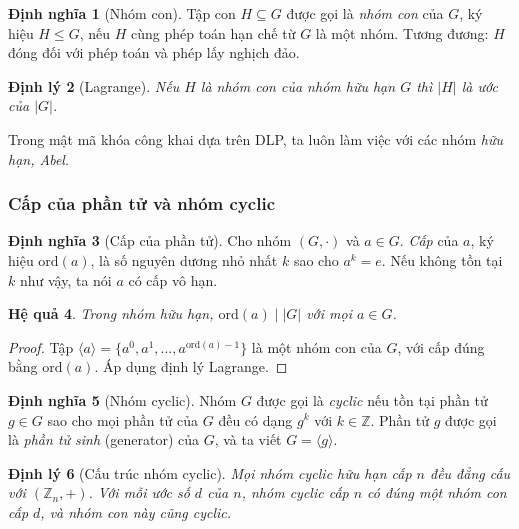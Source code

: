 \documentclass[12pt,a4paper]{report}
\newtheorem{theorem}{Định lý}[chapter]
\newtheorem{corollary}[theorem]{Hệ quả}
\theoremstyle{definition}
\newtheorem{definition}[theorem]{Định nghĩa}
\theoremstyle{remark}
\begin{document}
\begin{definition}[Nhóm con]
Tập con $H \subseteq G$ được gọi là \emph{nhóm con} của $G$, ký hiệu $H \leq G$, nếu $H$ cùng phép toán hạn chế từ $G$ là một nhóm. Tương đương: $H$ đóng đối với phép toán và phép lấy nghịch đảo.
\end{definition}

\begin{theorem}[Lagrange]
\label{thm:lagrange}
Nếu $H$ là nhóm con của nhóm hữu hạn $G$ thì $|H|$ là ước của $|G|$.
\end{theorem}

Trong mật mã khóa công khai dựa trên DLP, ta luôn làm việc với các nhóm \emph{hữu hạn, Abel}.

\subsubsection{Cấp của phần tử và nhóm cyclic}

\begin{definition}[Cấp của phần tử]
Cho nhóm $(G, \cdot)$ và $a \in G$. \emph{Cấp} của $a$, ký hiệu $\mathrm{ord}(a)$, là số nguyên dương nhỏ nhất $k$ sao cho $a^k = e$. Nếu không tồn tại $k$ như vậy, ta nói $a$ có cấp vô hạn.
\end{definition}

\begin{corollary}
Trong nhóm hữu hạn, $\mathrm{ord}(a) \mid |G|$ với mọi $a \in G$.
\end{corollary}

\begin{proof}
Tập $\langle a \rangle = \{a^0, a^1, \ldots, a^{\mathrm{ord}(a)-1}\}$ là một nhóm con của $G$, với cấp đúng bằng $\mathrm{ord}(a)$. Áp dụng định lý Lagrange.
\end{proof}

\begin{definition}[Nhóm cyclic]
Nhóm $G$ được gọi là \emph{cyclic} nếu tồn tại phần tử $g \in G$ sao cho mọi phần tử của $G$ đều có dạng $g^k$ với $k \in \mathbb{Z}$. Phần tử $g$ được gọi là \emph{phần tử sinh} (generator) của $G$, và ta viết $G = \langle g \rangle$.
\end{definition}

\begin{theorem}[Cấu trúc nhóm cyclic]
Mọi nhóm cyclic hữu hạn cấp $n$ đều đẳng cấu với $(\mathbb{Z}_n, +)$. Với mỗi ước số $d$ của $n$, nhóm cyclic cấp $n$ có đúng \emph{một} nhóm con cấp $d$, và nhóm con này cũng cyclic.
\end{theorem}
\end{document}
